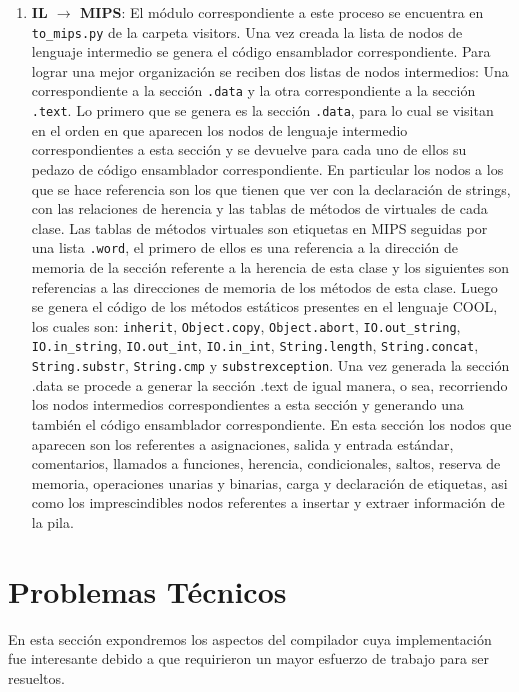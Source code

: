 \documentclass{article}
\begin{document}
\begin{enumerate}
	\item[] \textbf{IL $\rightarrow$ MIPS}: El m\'odulo correspondiente a este proceso se encuentra en \verb|to_mips.py| de la carpeta visitors. Una vez creada la lista de nodos de lenguaje intermedio se genera el código ensamblador correspondiente. Para lograr una mejor organización se reciben dos listas de nodos intermedios: Una correspondiente a la sección \verb|.data| y la otra correspondiente a la sección \verb|.text|. Lo primero que se genera es la sección \verb|.data|, para lo cual se visitan en el orden en que aparecen los nodos de lenguaje intermedio correspondientes a esta sección y se devuelve para cada uno de ellos su pedazo de código ensamblador correspondiente. En particular los nodos a los que se hace referencia son los que tienen que ver con la declaración de strings, con las relaciones de herencia y las tablas de métodos de virtuales de cada clase. Las tablas de métodos virtuales son etiquetas en MIPS seguidas por una lista \verb|.word|, el primero de ellos es una referencia a la dirección de memoria de la sección
	referente a la herencia de esta clase y los siguientes son referencias a las direcciones de memoria de
	los métodos de esta clase. Luego se genera el código de los métodos estáticos presentes en el
	lenguaje COOL, los cuales son: \verb|inherit|, \verb|Object.copy|, \verb|Object.abort|, \verb|IO.out_string|, \verb|IO.in_string|, \verb|IO.out_int|, \verb|IO.in_int|, \verb|String.length|, \verb|String.concat|, \verb|String.substr|, \verb|String.cmp| y \verb|substrexception|.
	Una vez generada la sección .data se procede a generar la sección .text de igual manera, o sea,
	recorriendo los nodos intermedios correspondientes a esta sección y generando una también el
	código ensamblador correspondiente. En esta sección los nodos que aparecen son los referentes a
	asignaciones, salida y entrada estándar, comentarios, llamados a funciones, herencia, condicionales,
	saltos, reserva de memoria, operaciones unarias y binarias, carga y declaración de etiquetas, asi
	como los imprescindibles nodos referentes a insertar y extraer información de la pila.
	
	
\end{enumerate}

\section{Problemas T\'ecnicos}

En esta secci\'on expondremos los aspectos del compilador cuya implementaci\'on fue interesante debido a que requirieron un mayor esfuerzo de trabajo para ser resueltos.
\end{document}
